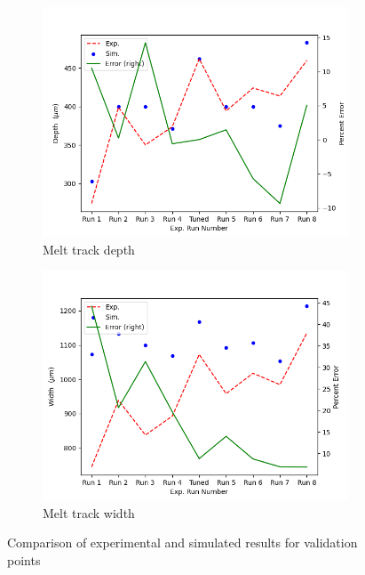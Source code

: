 \documentclass[pdflatex,sn-mathphys]{sn-jnl}
\begin{document}
	\begin{figure}[!htb]\centering
		\begin{subfigure}[c]{0.45\textwidth}\centering
		\includegraphics[width=\textwidth]{melt_track_val_depth}
		\caption{Melt track depth}
		\label{fig:melt_track_val_depth}
		\end{subfigure}\hfill{}
			\begin{subfigure}[c]{0.45\textwidth}\centering
			\includegraphics[width=\textwidth]{melt_track_val_width}
			\caption{Melt track width}
			\label{fig:melt_track_val_width}
			\end{subfigure}
		\caption{Comparison of experimental and simulated results for validation points}
		\label{fig:melt_track_val}
	\end{figure}
\end{document}
